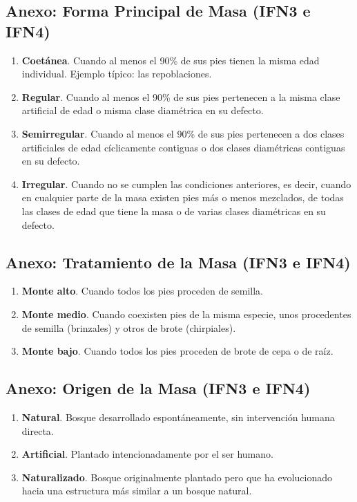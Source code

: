 \subsection{Anexo: Forma Principal de Masa (IFN3 e IFN4)}\label{sec:FPMasa}

\begin{enumerate}
    \item \textbf{Coetánea}. Cuando al menos el 90\% de sus pies tienen la misma edad individual. Ejemplo típico: las repoblaciones.
    \item \textbf{Regular}. Cuando al menos el 90\% de sus pies pertenecen a la misma clase artificial de edad o misma clase diamétrica en su defecto.
    \item \textbf{Semirregular}. Cuando al menos el 90\% de sus pies pertenecen a dos clases artificiales de edad cíclicamente contiguas o dos clases diamétricas contiguas en su defecto.
    \item \textbf{Irregular}. Cuando no se cumplen las condiciones anteriores, es decir, cuando en cualquier parte de la masa existen pies más o menos mezclados, de todas las clases de edad que tiene la masa o de varias clases diamétricas en su defecto.
\end{enumerate}

\subsection{Anexo: Tratamiento de la Masa (IFN3 e IFN4)}\label{sec:tratmasa}

\begin{enumerate}
    \item \textbf{Monte alto}. Cuando todos los pies proceden de semilla.
    \item \textbf{Monte medio}. Cuando coexisten pies de la misma especie, unos procedentes de semilla (brinzales) y otros de brote (chirpiales).
    \item \textbf{Monte bajo}. Cuando todos los pies proceden de brote de cepa o de raíz.
\end{enumerate}


\subsection{Anexo: Origen de la Masa (IFN3 e IFN4)}\label{sec:OrgMasa}

\begin{enumerate}
    \item \textbf{Natural}. Bosque desarrollado espontáneamente, sin intervención humana directa.
    \item \textbf{Artificial}. Plantado intencionadamente por el ser humano.
    \item \textbf{Naturalizado}. Bosque originalmente plantado pero que ha evolucionado hacia una estructura más similar a un bosque natural.
\end{enumerate}

